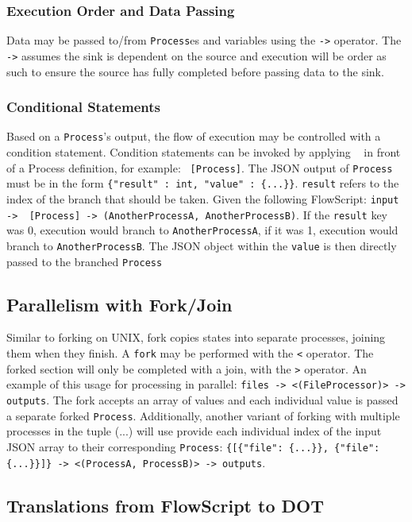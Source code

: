 \documentclass{article}
\begin{document}
			\subsubsection{Execution Order and Data Passing} Data may be passed to/from \texttt{Process}es and variables using the \texttt{->} operator. The \texttt{->} assumes the sink is dependent on the source and execution will be order as such to ensure the source has fully completed before passing data to the sink.
			\subsubsection{Conditional Statements} Based on a \texttt{Process}'s output, the flow of execution may be controlled with a condition statement. Condition statements can be invoked by applying \texttt{~} in front of a Process definition, for example: \texttt{~[Process]}. The JSON output of \texttt{Process} must be in the form \texttt{\{"result" : int, "value" : \{...\}\}}. \texttt{result} refers to the index of the branch that should be taken. Given the following FlowScript: \texttt{input{} -> ~[Process] -> (AnotherProcessA, AnotherProcessB)}. If the \texttt{result} key was 0, execution would branch to \texttt{AnotherProcessA}, if it was 1, execution would branch to \texttt{AnotherProcessB}. The JSON object within the \texttt{value} is then directly passed to the branched \texttt{Process}
			\subsection{Parallelism with Fork/Join} Similar to forking on UNIX, fork copies states into separate processes, joining them when they finish. A \texttt{fork} may be performed with the \texttt{<} operator. The forked section will only be completed with a join, with the \texttt{>} operator. An example of this usage for processing in parallel: \texttt{files{} -> <(FileProcessor)> -> outputs}. The fork accepts an array of values and each individual value is passed a separate forked \texttt{Process}. Additionally, another variant of forking with multiple processes in the tuple (...) will use provide each individual index of the input JSON array to their corresponding \texttt{Process}: \texttt{\{[\{"file": \{...\}\}, \{"file": \{...\}\}]\} -> <(ProcessA, ProcessB)> -> outputs}.

		\subsection{Translations from FlowScript to DOT}
\end{document}

